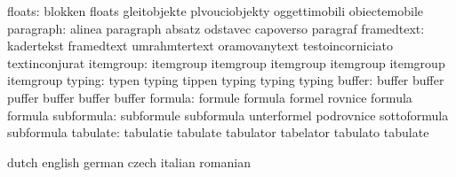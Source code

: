                    floats: blokken                   floats
                           gleitobjekte              plvouciobjekty
                           oggettimobili             obiectemobile
                paragraph: alinea                    paragraph
                           absatz                    odstavec
                           capoverso                 paragraf
               framedtext: kadertekst                framedtext
                           umrahmtertext             oramovanytext
                           testoincorniciato         textinconjurat
                itemgroup: itemgroup                 itemgroup
                           itemgroup                 itemgroup
                           itemgroup                 itemgroup
                   typing: typen                     typing
                           tippen                    typing
                           typing                    typing %
                   buffer: buffer                    buffer
                           puffer                    buffer
                           buffer                    buffer
                  formula: formule                   formula
                           formel                    rovnice
                           formula                   formula
               subformula: subformule                subformula
                           unterformel               podrovnice
                           sottoformula              subformula
                 tabulate: tabulatie                 tabulate
                           tabulator                 tabelator
                           tabulato                  tabulate

\stopsetupvariables




\startelements             dutch                     english
                           german                    czech
                           italian                   romanian

